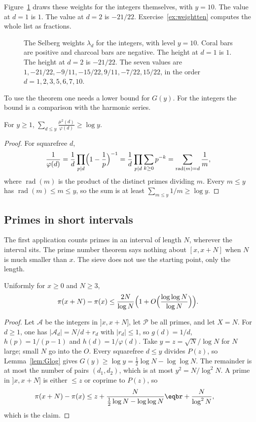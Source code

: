 Figure~\ref{fig:selweights} draws these weights for the integers themselves, with $y=10$. The value at $d=1$ is $1$. The value at $d=2$ is $-21/22$. Exercise~\ref{ex:weightten} computes the whole list as fractions.

\begin{figure}[ht]
\centering
{}
\caption{The Selberg weights $\lambda_d$ for the integers, with level $y=10$. Coral bars are positive and charcoal bars are negative. The height at $d=1$ is $1$. The height at $d=2$ is $-21/22$. The seven values are $1,-21/22,-9/11,-15/22,9/11,-7/22,15/22$, in the order $d=1,2,3,5,6,7,10$.}
\label{fig:selweights}
\end{figure}

To use the theorem one needs a lower bound for $G(y)$. For the integers the bound is a comparison with the harmonic series.

\begin{lemma}\label{lem:Glog}
For $y\ge1$, $\displaystyle\sum_{d\le y}\frac{\mu^2(d)}{\varphi(d)}\ge\log y$.
\end{lemma}
\begin{proof}
For squarefree $d$,
\[
\frac1{\varphi(d)}=\frac1d\prod_{p\mid d}\Bigl(1-\frac1p\Bigr)^{-1}=\frac1d\prod_{p\mid d}\sum_{k\ge0}p^{-k}=\sum_{\operatorname{rad}(m)=d}\frac1m,
\]
where $\operatorname{rad}(m)$ is the product of the distinct primes dividing $m$. Every $m\le y$ has $\operatorname{rad}(m)\le m\le y$, so the sum is at least $\sum_{m\le y}1/m\ge\log y$.
\end{proof}

\subsection*{Primes in short intervals}

The first application counts primes in an interval of length $N$, wherever the interval sits. The prime number theorem says nothing about $[x,x+N]$ when $N$ is much smaller than $x$. The sieve does not use the starting point, only the length.

\begin{theorem}\label{thm:bt}
Uniformly for $x\ge0$ and $N\ge3$,
\[
\pi(x+N)-\pi(x)\le\frac{2N}{\log N}\Bigl(1+O\Bigl(\frac{\log\log N}{\log N}\Bigr)\Bigr).
\]
\end{theorem}
\begin{proof}
Let $\mathcal A$ be the integers in $]x,x+N]$, let $\mathcal P$ be all primes, and let $X=N$. For $d\ge1$, one has $|\mathcal A_d|=N/d+r_d$ with $|r_d|\le1$, so $g(d)=1/d$, $h(p)=1/(p-1)$ and $h(d)=1/\varphi(d)$. Take $y=z=\sqrt N/\log N$ for $N$ large; small $N$ go into the $O$. Every squarefree $d\le y$ divides $P(z)$, so Lemma~\ref{lem:Glog} gives $G(y)\ge\log y=\frac12\log N-\log\log N$. The remainder is at most the number of pairs $(d_1,d_2)$, which is at most $y^2=N/\log^2N$. A prime in $]x,x+N]$ is either $\le z$ or coprime to $P(z)$, so
\[
\begin{aligned}\pi(x+N)-\pi(x)&\le z+\frac N{\frac12\log N-\log\log N}\eqbr+\frac N{\log^2N},\end{aligned}
\]
which is the claim.
\end{proof}

